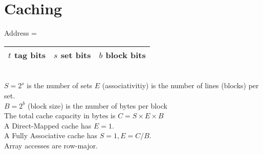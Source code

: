 \documentclass[11pt]{article}
\begin{document}
\section{Caching}
Address = 
\begin{tabular}{|c|c|c|}
\hline
$t$ tag bits & $s$ set bits & $b$ block bits \\
\hline
\end{tabular} \\
$S = 2^s$ is the number of sets
$E$ (associativitiy) is the number of lines (blocks) per set.   \\
$B = 2^b$ (block size) is the number of bytes per block         \\
The total cache capacity in bytes is $C = S \times E \times B$  \\
A Direct-Mapped cache has $E = 1$. \\
A Fully Associative cache has $S = 1, E = C/B$. \\
Array accesses are row-major. \\
\end{document}
